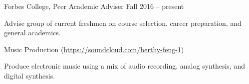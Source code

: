 \documentclass[12pt]{my_resume}
\begin{document}
\vspace{-8pt}

\begin{resitem}{Forbes College, Peer Academic Adviser}%
{Fall 2016 -- present}
  \item Advise group of current freshmen on course selection, career %
  preparation, and general academics.
\end{resitem}

\vspace{-8pt}

\begin{resitem}{Music Production %
(\url{https://soundcloud.com/berthy-feng-1})}{}
  \item Produce electronic music using a mix of audio recording, %
  analog synthesis, and digital synthesis.
\end{resitem}
\end{document}
